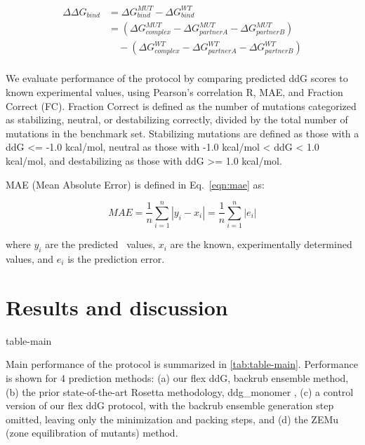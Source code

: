\begin{equation}\label{eqn:split-ddg}
  \begin{split}
    {\Delta\Delta}G_{bind} & ={\Delta}G^{MUT}_{bind} - {\Delta}G^{WT}_{bind}\\
    & =({\Delta}G^{MUT}_{complex} - {\Delta}G^{MUT}_{partner A} - {\Delta}G^{MUT}_{partner B})\\
    & \quad - ({\Delta}G^{WT}_{complex} - {\Delta}G^{WT}_{partner A} - {\Delta}G^{WT}_{partner B})\\
  \end{split}
\end{equation}

We evaluate performance of the protocol by comparing predicted ddG scores to known experimental values, using Pearson's correlation R, MAE, and Fraction Correct (FC). Fraction Correct is defined as the number of mutations categorized as stabilizing, neutral, or destabilizing correctly, divided by the total number of mutations in the benchmark set. Stabilizing mutations are defined as those with a ddG <= -1.0 kcal/mol, neutral as those with -1.0 kcal/mol < ddG < 1.0 kcal/mol, and destabilizing as those with ddG >= 1.0 kcal/mol.

MAE (Mean Absolute Error) is defined in Eq.~\ref{eqn:mae} as:

\begin{equation}\label{eqn:mae}
  MAE = \dfrac{1}{n}\sum\limits_{i=1}^n|y_i-x_i| = \dfrac{1}{n}\sum\limits_{i=1}^n|e_i|
\end{equation}

where $y_i$ are the predicted \ddg\ values, $x_i$ are the known, experimentally determined values, and $e_i$ is the prediction error.

\section{Results and discussion}

{table-main}

Main performance of the protocol is summarized in \cref{tab:table-main}. Performance is shown for 4 prediction methods: (a) our flex ddG, backrub ensemble method, (b) the prior state-of-the-art Rosetta methodology, ddg\_monomer \cite{kellogg_role_2011}, (c) a control version of our flex ddG protocol, with the backrub ensemble generation step omitted, leaving only the minimization and packing steps, and (d) the ZEMu (zone equilibration of mutants) method\cite{dourado_multiscale_2014}.

